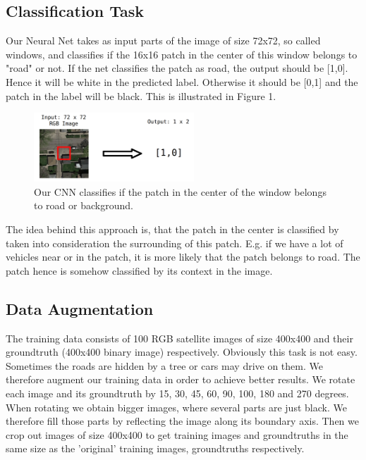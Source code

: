 \documentclass[10pt,conference,compsocconf]{IEEEtran}
\begin{document}
\subsection{Classification Task}
Our Neural Net takes as input parts of the image of size 72x72, so called windows, and classifies if the 16x16 patch in the center of this window belongs to "road" or not. If the net classifies the patch as road, the output should be [1,0]. Hence it will be white in the predicted label.  Otherwise it should be [0,1] and the patch in the label will be black. This is illustrated in Figure 1.
\begin{figure}[htbp]
	\centering
	\includegraphics[width=6cm]{images/classificationTask.png}
	\caption{Our CNN classifies if the patch in the center of the window belongs to road or background.}
	\vspace{-3mm}
	\label{fig:clas}
\end{figure}

The idea behind this approach is, that the patch in the center is classified by taken into consideration the surrounding of this patch. E.g. if we have a lot of vehicles near or in the patch, it is more likely that the patch belongs to road. The patch hence is somehow classified by its context in the image. \\


\subsection{Data Augmentation}

The training data consists of 100 RGB satellite images of size 400x400 and their groundtruth (400x400 binary image) respectively. 
Obviously this task is not easy. Sometimes the roads are hidden by a tree or cars may drive on them. 
We therefore augment our training data in order to achieve better results. We rotate each image and its groundtruth by 15, 30, 45, 60, 90, 100, 180 and 270 degrees. When rotating we obtain bigger images, where several parts are just black. We therefore fill those parts by reflecting the image along its boundary axis. Then we crop out images of size 400x400 to get training images and groundtruths in the same size as the 'original' training images, groundtruths respectively.
\end{document}
